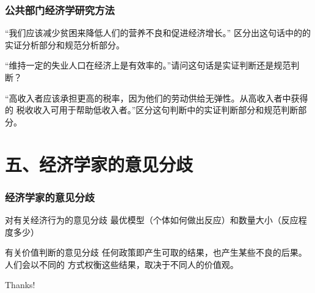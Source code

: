 \documentclass[aspectratio=169, 12pt]{beamer}
\begin{document}
\begin{frame}[plain]
    \frametitle{公共部门经济学研究方法} 
    “我们应该减少贫困来降低人们的营养不良和促进经济增长。”
    区分出这句话中的的实证分析部分和规范分析部分。
    \par
    “维持一定的失业人口在经济上是有效率的。”请问这句话是实证判断还是规范判断？
    \par
    “高收入者应该承担更高的税率，因为他们的劳动供给无弹性。从高收入者中获得的
    税收收入可用于帮助低收入者。”区分这句判断中的实证判断部分和规范判断部分。
\end{frame}

\section{五、经济学家的意见分歧}

\begin{frame}[plain]
    \frametitle{经济学家的意见分歧} 
    \begin{block}{对有关经济行为的意见分歧}
        最优模型（个体如何做出反应）和数量大小（反应程度多少）
    \end{block}
    \begin{block}{有关价值判断的意见分歧}
        任何政策即产生可取的结果，也产生某些不良的后果。人们会以不同的
        方式权衡这些结果，取决于不同人的价值观。
    \end{block}
\end{frame}

\begin{frame}[standout]
    \begin{center}
        {\Huge\calligra Thanks!}
      \end{center}
\end{frame}
\end{document}
